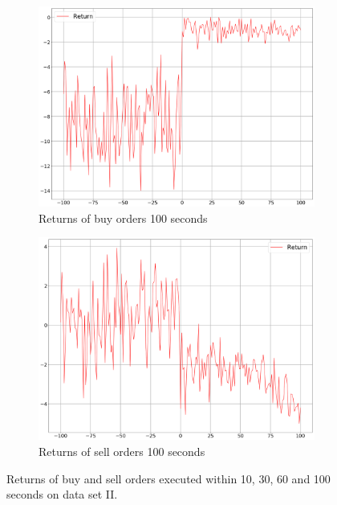 \begin{figure}[H]
\begin{subfigure}[b]{0.45\textwidth}
        \includegraphics[width=\textwidth]{images/behaviour-up-100s-buy.png}
        \caption{Returns of buy orders 100 seconds}
        \label{fig:behvaiour-up-100s-buy}
    \end{subfigure}
    \begin{subfigure}[b]{0.45\textwidth}
        \includegraphics[width=\textwidth]{images/behaviour-up-100s-sell.png}
        \caption{Returns of sell orders 100 seconds}
        \label{fig:behvaiour-up-100s-sell}
    \end{subfigure}
    \caption{Returns of buy and sell orders executed within 10, 30, 60 and 100 seconds on data set II.}
    \label{fig:behvaiour-up}
\end{figure}

